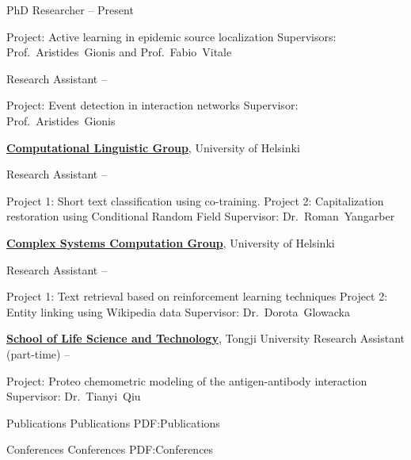 \documentclass[letterpaper,MMMyyyy,nonstopmode]{simpleresumecv}
\begin{document}
\begin{Body}
\Gap
\BulletItem
PhD Researcher
\hfill
{} --
Present
\begin{Detail}
\SubBulletItem
Project:
Active learning in epidemic source localization
\SubBulletItem
Supervisors:
Prof.~Aristides~Gionis and
Prof.~Fabio~Vitale
\end{Detail}

\Gap
\BulletItem
Research Assistant
\hfill
{} --
\begin{Detail}
\SubBulletItem
Project:
Event detection in interaction networks
\SubBulletItem
Supervisor:
Prof.~Aristides~Gionis
\end{Detail}


\Entry
\href{}
{\textbf{Computational Linguistic Group}},
University of Helsinki

\Gap
\BulletItem
Research Assistant
\hfill
{} --
\begin{Detail}
\SubBulletItem
Project 1: Short text classification using co-training.
\SubBulletItem
Project 2: Capitalization restoration using Conditional Random Field
\SubBulletItem
Supervisor:
Dr.~Roman~Yangarber
\end{Detail}

\Entry
\href{}
{\textbf{Complex Systems Computation Group}},
University of Helsinki

\Gap
\BulletItem
Research Assistant
\hfill
{} --
\begin{Detail}
\SubBulletItem
Project 1: Text retrieval based on reinforcement learning techniques
\SubBulletItem
Project 2: Entity linking using Wikipedia data
\SubBulletItem
Supervisor:
Dr.~Dorota~Glowacka
\end{Detail}

\Entry
\href{}
{\textbf{School of Life Science and Technology}},
Tongji University
\Gap
\BulletItem
Research Assistant (part-time)
\hfill
{} --
\begin{Detail}
\SubBulletItem
Project: Proteo chemometric modeling of the antigen-antibody interaction
\SubBulletItem
Supervisor:
Dr.~Tianyi~Qiu
\end{Detail}


\Section
{Publications}
{Publications}
{PDF:Publications}

\BigGap
\SubSection
{Conferences}
{Conferences}
{PDF:Conferences}


\end{Body}
\end{document}
